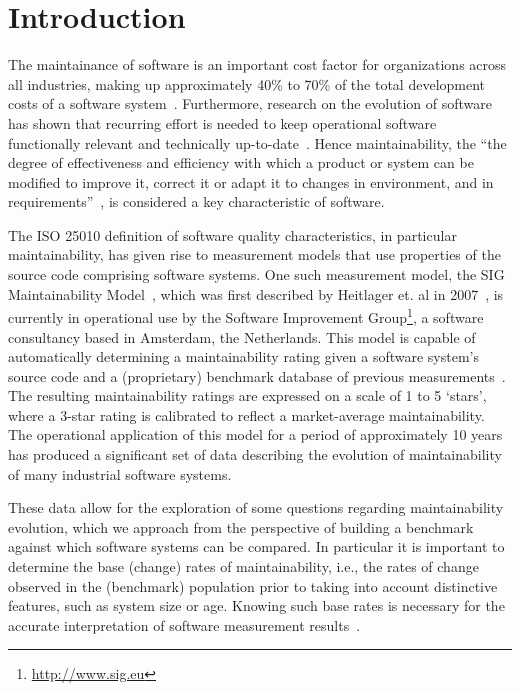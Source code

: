 \section{Introduction}
The maintainance of software is an important cost factor for organizations across all industries, making up approximately 40\% to 70\% of the total development costs of a software system~\cite{grubb2003software}.
Furthermore, research on the evolution of software has shown that recurring effort is needed to keep operational software functionally relevant and technically up-to-date~\cite{lehman1980programs}.  
Hence maintainability, the ``the degree of effectiveness and efficiency with which a product or system can be modified to improve it, correct it or adapt it to changes in environment, and in requirements''~\cite{iso25010}, is considered a key characteristic of software.

The {ISO 25010} definition of software quality characteristics, in particular maintainability, has given rise to measurement models that use properties of the source code comprising software systems.
One such measurement model, the SIG Maintainability Model~\cite{sig-maintainability-model}, which was first described by Heitlager et. al in 2007~\cite{heitlager2007practical}, is currently in operational use by the Software Improvement Group\footnote{\url{http://www.sig.eu}}, a software consultancy based in Amsterdam, the Netherlands.
This model is capable of automatically determining a maintainability rating given a software system's source code and a (proprietary) benchmark database of previous measurements~\cite{alves2010deriving}.
The resulting maintainability ratings are expressed on a scale of 1 to 5 `stars', where a 3-star rating is calibrated to reflect a market-average maintainability.
The operational application of this model for a period of approximately 10 years has produced a significant set of data describing the evolution of maintainability of many industrial software systems.

These data allow for the exploration of some questions regarding maintainability evolution, which we approach from the perspective of building a benchmark against which software systems can be compared.
In particular it is important to determine the base (change) rates of maintainability, i.e., the rates of change observed in the (benchmark) population prior to taking into account distinctive features, such as system size or age.
Knowing such base rates is necessary for the accurate interpretation of software measurement results~\cite{bruntink2015towards}.

